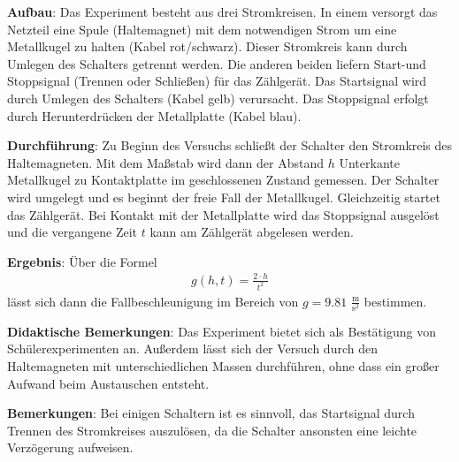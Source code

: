 \documentclass[../main.tex]{subfiles}
\begin{document}
\begin{tcolorbox}
    \vspace{0.5cm}
    \textbf{Aufbau}: Das Experiment besteht aus drei Stromkreisen. In einem versorgt das Netzteil eine Spule (Haltemagnet) mit dem notwendigen Strom um eine Metallkugel zu halten (Kabel rot/schwarz). Dieser Stromkreis kann durch Umlegen des Schalters getrennt werden. Die anderen beiden liefern Start-und Stoppsignal (Trennen oder Schließen) für das Zählgerät. Das Startsignal wird durch Umlegen des Schalters (Kabel gelb) verursacht. Das Stoppsignal erfolgt durch Herunterdrücken der Metallplatte (Kabel blau).
    
    \vspace{0.5cm}
    \textbf{Durchführung}: Zu Beginn des Versuchs schließt der Schalter den Stromkreis des Haltemagneten. Mit dem Maßstab wird dann der Abstand $h$ \glqq Unterkante  Metallkugel\grqq{} zu \glqq Kontaktplatte im geschlossenen Zustand\grqq{} gemessen. Der Schalter wird umgelegt und es beginnt der freie Fall der Metallkugel. Gleichzeitig startet das Zählgerät. Bei Kontakt mit der Metallplatte wird das Stoppsignal ausgelöst und die vergangene Zeit $t$ kann am Zählgerät abgelesen werden.  

    \vspace{0.5cm}
    \textbf{Ergebnis}: Über die Formel
    \begin{align*}
        g(h,t) = \frac{2 \cdot h}{t^2}
    \end{align*}
    lässt sich dann die Fallbeschleunigung im Bereich von $g=9.81 \,\, \frac{\text{m}}{\text{s}^2}$ bestimmen. 
    
    \vspace{0.5cm}
    \textbf{Didaktische Bemerkungen}: Das Experiment bietet sich als Bestätigung von Schülerexperimenten an. Außerdem lässt sich der Versuch durch den Haltemagneten mit unterschiedlichen Massen durchführen, ohne dass ein großer Aufwand beim Austauschen entsteht.

    \vspace{0.5cm}
    \textbf{Bemerkungen}: Bei einigen Schaltern ist es sinnvoll, das Startsignal durch Trennen des Stromkreises auszulösen, da die Schalter ansonsten eine leichte Verzögerung aufweisen.

    \vspace{0cm}
\end{tcolorbox}
\end{document}
